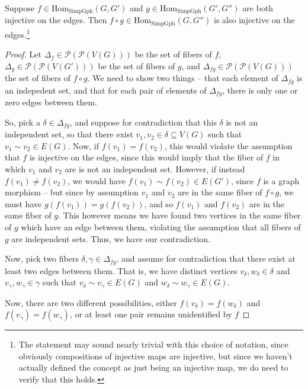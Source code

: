 \documentclass[a4paper,reqno,oneside]{article} %
\begin{document}
\begin{lemma}\label{lemma_mu_morphisms_compose}
Suppose $f \in \mathrm{Hom}_{\mathrm{SimpGph}}(G, G')$ and $g \in \mathrm{Hom}_{\mathrm{SimpGph}}(G', G'')$ are both injective on the edges. Then $f \circ g \in \mathrm{Hom}_{\mathrm{SimpGph}}(G, G'')$ is also injective on the edges.\footnote{The statement may sound nearly trivial with this choice of notation, since obviously compositions of injective maps are injective, but since we haven't actually defined the concept as just being an injective map, we do need to verify that this holds.}
\begin{proof}
Let $\Delta_f \in \mathcal{P}(\mathcal{P}(V(G)))$ be the set of fibers of $f$, $\Delta_g \in \mathcal{P}(\mathcal{P}(V(G')))$ be the set of fibers of $g$, and $\Delta_{fg} \in \mathcal{P}(\mathcal{P}(V(G)))$ the set of fibers of $f\circ g$. We need to show two things -- that each element of $\Delta_{fg}$ is an indepedent set, and that for each pair of elements of $\Delta_{fg}$, there is only one or zero edges between them.

So, pick a $\delta \in \Delta_{fg}$, and suppose for contradiction that this $\delta$ is not an independent set, so that there exist $v_1, v_2 \in \delta \subseteq V(G)$ such that $v_1 \sim v_2 \in E(G)$. Now, if $f(v_1) = f(v_2)$, this would violate the assumption that $f$ is injective on the edges, since this would imply that the fiber of $f$ in which $v_1$ and $v_2$ are is not an independent set. However, if instead $f(v_1) \neq f(v_2)$, we would have $f(v_1) \sim f(v_2) \in E(G')$, since $f$ is a graph morphism -- but since by assumption $v_1$ and $v_2$ are in the same fiber of $f\circ g$, we must have $g(f(v_1)) = g(f(v_2))$, and so $f(v_1)$ and $f(v_2)$ are in the same fiber of $g$. This however means we have found two vertices in the same fiber of $g$ which have an edge between them, violating the assumption that all fibers of $g$ are independent sets. Thus, we have our contradiction.

Now, pick two fibers $\delta, \gamma \in \Delta_{fg}$, and assume for contradiction that there exist at least two edges between them. That is, we have distinct vertices $v_\delta, w_\delta \in \delta$ and $v_\gamma, w_\gamma \in \gamma$ such that $v_\delta \sim v_\gamma \in E(G)$ and $w_\delta \sim w_\gamma \in E(G)$.

Now, there are two different possibilities, either $f(v_
\delta) = f(w_\delta)$ and $f(v_\gamma) = f(w_\gamma)$, or at least one pair remains unidentified by $f$


\end{proof}
\end{lemma}
\end{document}
